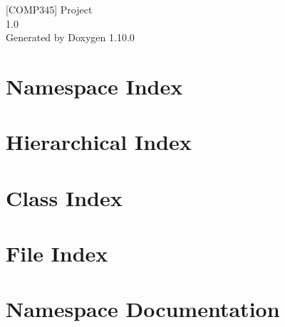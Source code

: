 \documentclass[twoside]{book}
\newcommand{\+}{\discretionary{\mbox{\scriptsize$\hookleftarrow$}}{}{}}
\newcommand{\clearemptydoublepage}{%
    \newpage{\pagestyle{empty}\cleardoublepage}%
  }
\begin{document}
  \raggedbottom
    \hypersetup{pageanchor=false,
                bookmarksnumbered=true,
                pdfencoding=unicode
               }
  \begin{titlepage}
  \vspace*{7cm}
  \begin{center}%
  {\Large \mbox{[}\+COMP345\mbox{]} Project}\\
  [1ex]\large 1.\+0 \\
  \vspace*{1cm}
  {\large Generated by Doxygen 1.10.0}\\
  \end{center}
  \end{titlepage}
  \clearemptydoublepage
  \tableofcontents
  \clearemptydoublepage
  \hypersetup{pageanchor=true}
\chapter{Namespace Index}

\chapter{Hierarchical Index}

\chapter{Class Index}

\chapter{File Index}

\chapter{Namespace Documentation}






















\end{document}

